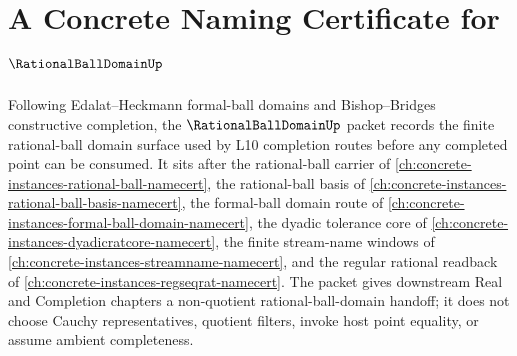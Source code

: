 \chapter{A Concrete Naming Certificate for $\RationalBallDomainUp$}
\label{ch:concrete-instances-rational-ball-domain-namecert}

Following Edalat--Heckmann formal-ball domains and Bishop--Bridges constructive completion, the $\RationalBallDomainUp$ packet records the finite rational-ball domain surface used by L10 completion routes before any completed point can be consumed. It sits after the rational-ball carrier of \autoref{ch:concrete-instances-rational-ball-namecert}, the rational-ball basis of \autoref{ch:concrete-instances-rational-ball-basis-namecert}, the formal-ball domain route of \autoref{ch:concrete-instances-formal-ball-domain-namecert}, the dyadic tolerance core of \autoref{ch:concrete-instances-dyadicratcore-namecert}, the finite stream-name windows of \autoref{ch:concrete-instances-streamname-namecert}, and the regular rational readback of \autoref{ch:concrete-instances-regseqrat-namecert}. The packet gives downstream Real and Completion chapters a non-quotient rational-ball-domain handoff; it does not choose Cauchy representatives, quotient filters, invoke host point equality, or assume ambient completeness.

